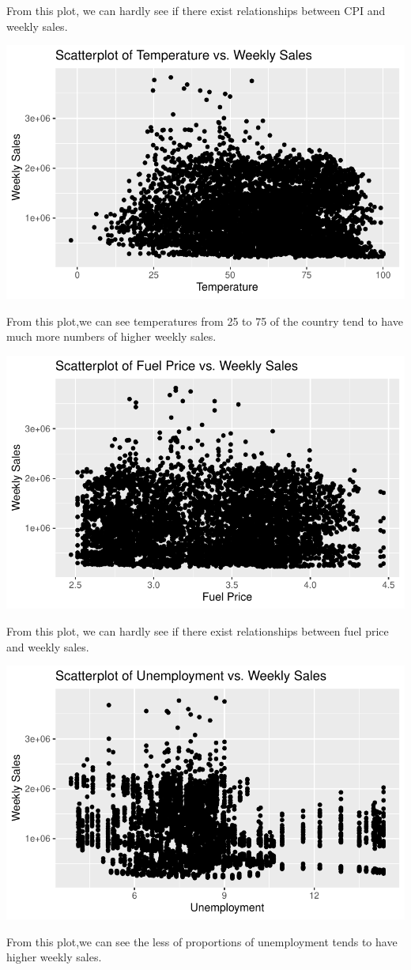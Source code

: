 \documentclass[
  letterpaper,
  DIV=11,
  numbers=noendperiod]{scrartcl}
\begin{document}
From this plot, we can hardly see if there exist relationships between
CPI and weekly sales.

\includegraphics{678final_files/figure-pdf/unnamed-chunk-9-1.pdf}

From this plot,we can see temperatures from 25 to 75 of the country tend
to have much more numbers of higher weekly sales.

\includegraphics{678final_files/figure-pdf/unnamed-chunk-10-1.pdf}

From this plot, we can hardly see if there exist relationships between
fuel price and weekly sales.

\includegraphics{678final_files/figure-pdf/unnamed-chunk-11-1.pdf}

From this plot,we can see the less of proportions of unemployment tends
to have higher weekly sales.
\end{document}
